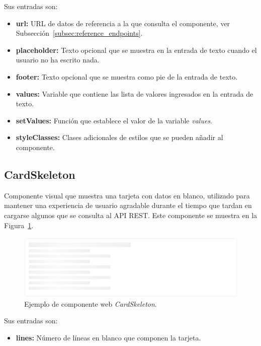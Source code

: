 \documentclass[a4paper, 12pt]{book}
\begin{document}
    Sus entradas son:

    \begin{itemize}
        \item \textbf{url:} URL de datos de referencia a la que consulta el componente, ver Subsección~\ref{subsec:reference_endpoints}.
        \item \textbf{placeholder:} Texto opcional que se muestra en la entrada de texto cuando el usuario no ha escrito nada.
        \item \textbf{footer:} Texto opcional que se muestra como pie de la entrada de texto.
        \item \textbf{values:} Variable que contiene las lista de valores ingresados en la entrada de texto.
        \item \textbf{setValues:} Función que establece el valor de la variable \emph{values}.
        \item \textbf{styleClasses:} Clases adicionales de estilos que se pueden añadir al componente.
    \end{itemize}

    \subsection{CardSkeleton}
    \label{subsec:wc_card_skeleton}
    Componente visual que muestra una tarjeta con datos en blanco, utilizado para mantener una experiencia de usuario agradable durante el tiempo que tardan en cargarse algunos que se consulta al API REST.
    Este componente se muestra en la Figura~\ref{fig:component_card_skeleton}.

    \begin{figure}
        \centering
        \includegraphics[width=15cm, keepaspectratio]{img/CardSkeleton.PNG}
        \caption{Ejemplo de componente web \emph{CardSkeleton}.}\label{fig:component_card_skeleton}
    \end{figure}

    Sus entradas son:

    \begin{itemize}
        \item \textbf{lines:} Número de líneas en blanco que componen la tarjeta.
    \end{itemize}
\end{document}
